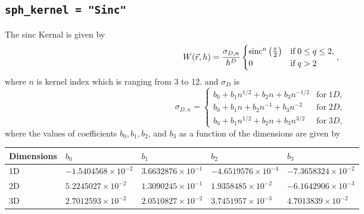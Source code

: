 \documentclass[notes.tex]{subfiles}
\begin{document}
\subsection{{\tt sph\_kernel = "Sinc"}}
The sinc Kernal is given by
\begin{equation}
W(\vec{r},h) = \frac{\sigma_{D,n}}{h^D} 
  \begin{cases}
    \operatorname{sinc}^n\left(\frac{\pi}{2}\right) & \text{if} \; 0 \leq q \leq 2, \\
    0        & \text{if} \;  q >2 
    \end{cases},
\end{equation}
where $n$ is kernel index which is ranging from 3 to 12. 
and $\sigma_D$ is
\begin{equation}
\sigma_{D,n} = 
  \begin{cases}
   b_0 + b_1 n^{1/2} + b_2 n + b_3 n^{-1/2} & \text{for} \; 1D, \\
   b_0 + b_1 n + b_2 n^{-1} + b_3 n^{-2} & \text{for} \; 2D, \\
   b_0 + b_1 n^{1/2} + b_2 n + b_3 n^{3/2} & \text{for} \; 3D,
    \end{cases}
\end{equation}
where the values of coefficients $b_0, b_1, b_2$, and $b_3$ as a function 
of the dimensions are given by
\begin{table}[]
\centering
\begin{tabular}{lllll}
\hline
Dimensions & $b_0$                       & $b_1$                      & $b_2$                       & $b_3$                       \\ \hline
1D         & $-1.5404568 \times 10^{-2}$ & $3.6632876 \times 10^{-1}$ & $-4.6519576 \times 10^{-4}$ & $-7.3658324 \times 10^{-2}$ \\
2D         & $5.2245027 \times 10^{-2}$  & $1.3090245 \times 10^{-1}$ & $1.9358485 \times 10^{-2}$  & $-6.1642906 \times 10^{-3}$ \\
3D         & $2.7012593 \times 10^{-2}$  & $2.0510827 \times 10^{-2}$ & $3.7451957 \times 10^{-3}$  & $4.7013839 \times 10^{-2}$  \\ \hline
\end{tabular}
\end{table}
\end{document}
